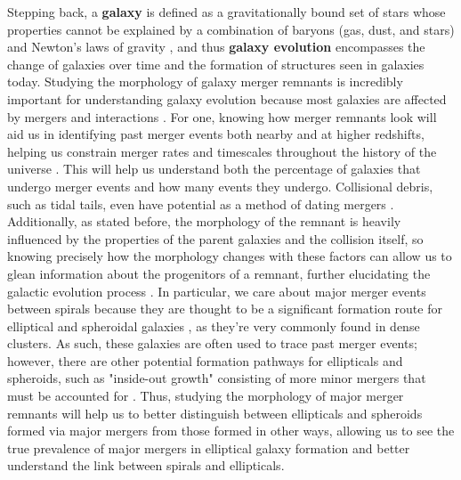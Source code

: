 \documentclass[twocolumn]{aastex631}
\begin{document}
Stepping back, a \textbf{galaxy} is defined as a gravitationally bound set of stars whose properties cannot be explained by a combination of baryons (gas, dust, and stars) and Newton's laws of gravity \citep{Willman+2012}, and thus \textbf{galaxy evolution} encompasses the change of galaxies over time and the formation of structures seen in galaxies today.
Studying the morphology of galaxy merger remnants is incredibly important for understanding galaxy evolution because most galaxies are affected by mergers and interactions \citep{Barnes+1992}.
For one, knowing how merger remnants look will aid us in identifying past merger events both nearby and at higher redshifts, helping us constrain merger rates and timescales throughout the history of the universe \citep{Lotz+2008}. 
This will help us understand both the percentage of galaxies that undergo merger events and how many events they undergo.
Collisional debris, such as tidal tails, even have potential as a method of dating mergers \cite{Duc2013}.
Additionally, as stated before, the morphology of the remnant is heavily influenced by the properties of the parent galaxies and the collision itself, so knowing precisely how the morphology changes with these factors can allow us to glean information about the progenitors of a remnant, further elucidating the galactic evolution process \citep{Barnes+1992}.
In particular, we care about major merger events between spirals because they are thought to be a significant formation route for elliptical and spheroidal galaxies \citep{Barnes+1992}, as they're very commonly found in dense clusters. 
As such, these galaxies are often used to trace past merger events; however, there are other potential formation pathways for ellipticals and spheroids, such as "inside-out growth" consisting of more minor mergers that must be accounted for \citep{Lotz+2008}.
Thus, studying the morphology of major merger remnants will help us to better distinguish between ellipticals and spheroids formed via major mergers from those formed in other ways, allowing us to see the true prevalence of major mergers in elliptical galaxy formation and better understand the link between spirals and ellipticals.
\end{document}
